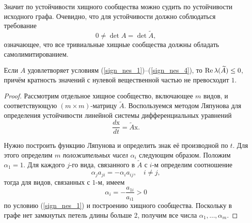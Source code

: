     Значит по устойчивости хищного сообщества можно судить по устойчивости исходного графа. Очевидно, что для устойчивости должно соблюдаться требование 
    \begin{equation*}
        0 \neq \det A = \det \widetilde{A},
    \end{equation*}
    означающее, что все тривиальные хищные сообщества должны обладать самолимитированием.
    
    \begin{theorem}
        Если \(A\) удовлетворяет условиям (\ref{sign_nes_1})--(\ref{sign_nes_4}), то \(\operatorname{Re} \lambda(\widetilde{A}) \leq 0 \), причём кратность значений с нулевой вещественной частью не превосходит \(1\).
    \end{theorem}
    \begin{proof}
        Рассмотрим отдельное хищное сообщество, включающее \(m\) видов, и соответствующую \((m \times m)\)-матрицу \(\widetilde{A}\). Воспользуемся методом Ляпунова для определения устойчивости линейной системы дифференциальных уравнений 
        \begin{equation} \label{sign_hunter_ode}
            \frac{d \mathrm{x}}{dt} = \widetilde{A} \mathrm{x}.
        \end{equation}

        Нужно построить функцию Ляпунова и определить знак её производной по \(t\). Для этого определим \(m\) \textit{положительных чисел} \(\alpha_i\) следующим образом. Положим \(\alpha_1 = 1\). Для каждого \(j\)-го вида, связанного в \(\widetilde{A}\) с \(i\)-м определим соотношение
        \begin{equation} \label{sign_conntcnted_ij}
            \alpha_j a_{ji} = -\alpha_i a_{ij}, \quad i \neq j,
        \end{equation}
        тогда для видов, связанных с \(1\)-м, имеем
        \begin{equation} \label{sign_conntcnted_to_1}
            \alpha_i = - \frac{a_{1i}}{a_{i1}} > 0
        \end{equation}
        по условию (\ref{sign_nes_1}) и построению хищного сообщества. Поскольку в графе нет замкнутых петель длины больше 2, получим все числа \(\alpha_1, \dots, \alpha_m\).


\end{proof}
